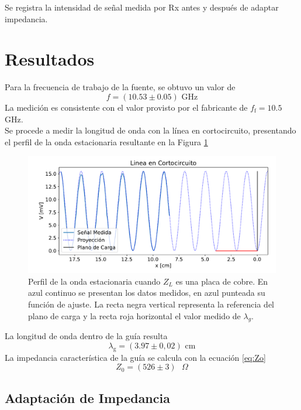 \documentclass[11pt,a4paper]{article}
\begin{document}
\begin{multicols}{2}
Se registra la intensidad de señal medida por Rx antes y después de adaptar impedancia.

\section{Resultados}
Para la frecuencia de trabajo de la fuente, se obtuvo un valor de 
$$
f = (10.53 \pm 0.05) \text{ GHz}
$$
La medición es consistente con el valor provisto por el fabricante de $f_\text{f}=10.5$ GHz. \\

Se procede a medir la longitud de onda con la línea en cortocircuito, presentando el perfil de la onda estacionaria resultante en la Figura \ref{fig:cortocir}
\begin{figure}[H]
    \centering
    \includegraphics[width=\linewidth]{Images/lineacc.pdf}
    \caption{Perfil de la onda estacionaria cuando $Z_L$ es una placa de cobre. En azul continuo se presentan los datos medidos, en azul punteada su función de ajuste. La recta negra vertical representa la referencia del plano de carga y la recta roja horizontal el valor medido de $\lambda_g$.}
    \label{fig:cortocir}
\end{figure}

La longitud de onda dentro de la guía resulta
$$
\lambda_\text{g} = (3.97 \pm 0,02) \text{ cm} 
$$
La impedancia característica de la guía se calcula con la ecuación \ref{eq:Zo}
\begin{equation}\label{eq:Zo_medido}
    Z_0 = (526 \pm 3) \text{ } \Omega   
\end{equation}

\subsection{Adaptación de Impedancia}


\end{multicols}
\end{document}
